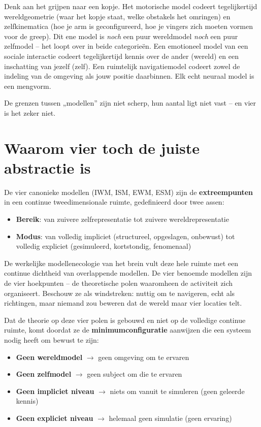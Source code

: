 \documentclass[11pt, twoside, openright]{book}
\begin{document}
Denk aan het grijpen naar een kopje. Het motorische model codeert tegelijkertijd wereldgeometrie (waar het kopje staat, welke obstakels het omringen) en zelfkinematica (hoe je arm is geconfigureerd, hoe je vingers zich moeten vormen voor de greep). Dit ene model is \textit{noch} een puur wereldmodel \textit{noch} een puur zelfmodel -- het loopt over in beide categorieën. Een emotioneel model van een sociale interactie codeert tegelijkertijd kennis over de ander (wereld) en een inschatting van jezelf (zelf). Een ruimtelijk navigatiemodel codeert zowel de indeling van de omgeving als jouw positie daarbinnen. Elk echt neuraal model is een mengvorm.

De grenzen tussen „modellen” zijn niet scherp, hun aantal ligt niet vast -- en vier is het zeker niet.

\section*{Waarom vier toch de juiste abstractie is}

De vier canonieke modellen (IWM, ISM, EWM, ESM) zijn de \textbf{extreempunten} in een continue tweedimensionale ruimte, gedefinieerd door twee assen:

\begin{itemize}
  \item \textbf{Bereik}: van zuivere zelfrepresentatie tot zuivere wereldrepresentatie
  \item \textbf{Modus}: van volledig impliciet (structureel, opgeslagen, onbewust) tot volledig expliciet (gesimuleerd, kortstondig, fenomenaal)
\end{itemize}

De werkelijke modellenecologie van het brein vult deze hele ruimte met een continue dichtheid van overlappende modellen. De vier benoemde modellen zijn de vier hoekpunten -- de theoretische polen waaromheen de activiteit zich organiseert. Beschouw ze als windstreken: nuttig om te navigeren, echt als richtingen, maar niemand zou beweren dat de wereld maar vier locaties telt.

Dat de theorie op deze vier polen is gebouwd en niet op de volledige continue ruimte, komt doordat ze de \textbf{minimumconfiguratie} aanwijzen die een systeem nodig heeft om bewust te zijn:

\begin{itemize}
  \item \textbf{Geen wereldmodel} $\rightarrow$ geen omgeving om te ervaren
  \item \textbf{Geen zelfmodel} $\rightarrow$ geen subject om die te ervaren
  \item \textbf{Geen impliciet niveau} $\rightarrow$ niets om vanuit te simuleren (geen geleerde kennis)
  \item \textbf{Geen expliciet niveau} $\rightarrow$ helemaal geen simulatie (geen ervaring)
\end{itemize}
\end{document}
